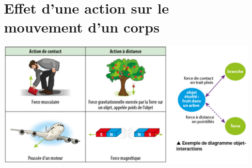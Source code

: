 \documentclass[xcolor={dvipsnames}]{beamer}
\begin{document}
\section{Effet d'une action sur le mouvement d'un corps}



\begin{frame}

\end{frame}


\begin{frame}
	\begin{center}
		\includegraphics[scale=0.4]{ex_actions_doi}
	\end{center}

\end{frame}
\end{document}
